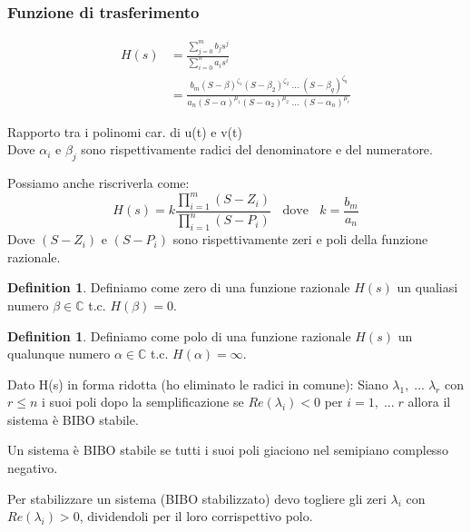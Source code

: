 \documentclass[a4paper]{article}
\newtheorem{lemma}[theorem]{Lemma}        %
\theoremstyle{definition}
\newtheorem{definition}[theorem]{Definition}
\theoremstyle{remark}
\renewenvironment{lemma}{\begin{thmbox}\begin{oldlemma}}{\end{oldlemma}\end{thmbox}}
\begin{document}
\subsubsection{Funzione di trasferimento}
    \begin{align*}
        H(s) &= \frac{\sum_{j=0}^{m}b_js^j}{\sum_{i=0}^{n}a_is^i}\\
        &= \frac{b_m(S-\beta)^{\zeta_1}(S-\beta_2)^{\zeta_2}\; ... \; (S-\beta_q)^{\zeta_q}}{a_n(S-\alpha)^{\mu_1}(S-\alpha_2)^{\mu_2}\; ... \; (S-\alpha_n)^{\mu_r}}
    \end{align*}
    \begin{center}
    \colorbox{blue!30!white}{Rapporto tra i polinomi car. di u(t) e v(t)}\\
    Dove $\alpha_i$ e $\beta_j$ sono rispettivamente radici del denominatore e del numeratore.
    \end{center}
    Possiamo anche riscriverla come:
    \[H(s) = k\frac{\prod_{i = 1}^m (S - Z_i)}{\prod_{i = 1}^n (S - P_i)} \; \;  \text{ dove } \; \; k = \frac{b_m}{a_n}\]
    Dove $(S - Z_i)$ e $(S - P_i)$ sono rispettivamente zeri e poli della funzione razionale. 
    

    \begin{definition}
        Definiamo come zero di una funzione razionale $H(s)$ un qualiasi numero $\beta \in \mathbb{C}$ t.c. $H(\beta) = 0$.
    \end{definition}
    \begin{definition}
        Definiamo come polo di una funzione razionale $H(s)$ un qualunque numero $\alpha \in \mathbb{C}$ t.c. $H(\alpha) = \infty$.
    \end{definition}
    \noindent
    Dato H(s) in forma ridotta (ho eliminato le radici in comune): Siano $\lambda_1, \; ... \; \lambda_r$ con $r \le n$ i suoi poli dopo la semplificazione
    se $Re(\lambda_i) < 0$ per $i = 1, \; ... \; r$ allora il sistema è BIBO stabile. 
    \begin{lemma}
        \label{lemma:polo_bibo_stabile}
        Un sistema è BIBO stabile se tutti i suoi poli giaciono nel semipiano complesso negativo.
    \end{lemma}
    \noindent
    Per stabilizzare un sistema (BIBO stabilizzato) devo togliere gli zeri $\lambda_i$ con $Re(\lambda_i) > 0$, dividendoli per il loro corrispettivo polo.
\end{document}
